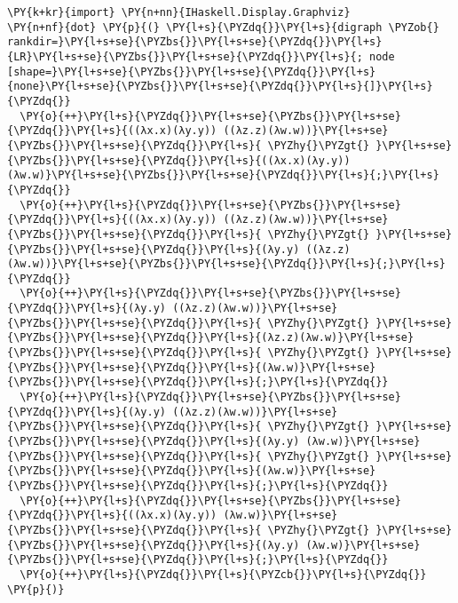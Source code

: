     \begin{tcolorbox}[breakable, size=fbox, boxrule=1pt, pad at break*=1mm,colback=cellbackground, colframe=cellborder, top=.75ex]
\begin{Verbatim}[commandchars=\\\{\}]
\PY{k+kr}{import} \PY{n+nn}{IHaskell.Display.Graphviz}
\PY{n+nf}{dot} \PY{p}{(} \PY{l+s}{\PYZdq{}}\PY{l+s}{digraph \PYZob{} rankdir=}\PY{l+s+se}{\PYZbs{}}\PY{l+s+se}{\PYZdq{}}\PY{l+s}{LR}\PY{l+s+se}{\PYZbs{}}\PY{l+s+se}{\PYZdq{}}\PY{l+s}{; node [shape=}\PY{l+s+se}{\PYZbs{}}\PY{l+s+se}{\PYZdq{}}\PY{l+s}{none}\PY{l+s+se}{\PYZbs{}}\PY{l+s+se}{\PYZdq{}}\PY{l+s}{]}\PY{l+s}{\PYZdq{}}
  \PY{o}{++}\PY{l+s}{\PYZdq{}}\PY{l+s+se}{\PYZbs{}}\PY{l+s+se}{\PYZdq{}}\PY{l+s}{((λx.x)(λy.y)) ((λz.z)(λw.w))}\PY{l+s+se}{\PYZbs{}}\PY{l+s+se}{\PYZdq{}}\PY{l+s}{ \PYZhy{}\PYZgt{} }\PY{l+s+se}{\PYZbs{}}\PY{l+s+se}{\PYZdq{}}\PY{l+s}{((λx.x)(λy.y)) (λw.w)}\PY{l+s+se}{\PYZbs{}}\PY{l+s+se}{\PYZdq{}}\PY{l+s}{;}\PY{l+s}{\PYZdq{}}
  \PY{o}{++}\PY{l+s}{\PYZdq{}}\PY{l+s+se}{\PYZbs{}}\PY{l+s+se}{\PYZdq{}}\PY{l+s}{((λx.x)(λy.y)) ((λz.z)(λw.w))}\PY{l+s+se}{\PYZbs{}}\PY{l+s+se}{\PYZdq{}}\PY{l+s}{ \PYZhy{}\PYZgt{} }\PY{l+s+se}{\PYZbs{}}\PY{l+s+se}{\PYZdq{}}\PY{l+s}{(λy.y) ((λz.z)(λw.w))}\PY{l+s+se}{\PYZbs{}}\PY{l+s+se}{\PYZdq{}}\PY{l+s}{;}\PY{l+s}{\PYZdq{}}
  \PY{o}{++}\PY{l+s}{\PYZdq{}}\PY{l+s+se}{\PYZbs{}}\PY{l+s+se}{\PYZdq{}}\PY{l+s}{(λy.y) ((λz.z)(λw.w))}\PY{l+s+se}{\PYZbs{}}\PY{l+s+se}{\PYZdq{}}\PY{l+s}{ \PYZhy{}\PYZgt{} }\PY{l+s+se}{\PYZbs{}}\PY{l+s+se}{\PYZdq{}}\PY{l+s}{(λz.z)(λw.w)}\PY{l+s+se}{\PYZbs{}}\PY{l+s+se}{\PYZdq{}}\PY{l+s}{ \PYZhy{}\PYZgt{} }\PY{l+s+se}{\PYZbs{}}\PY{l+s+se}{\PYZdq{}}\PY{l+s}{(λw.w)}\PY{l+s+se}{\PYZbs{}}\PY{l+s+se}{\PYZdq{}}\PY{l+s}{;}\PY{l+s}{\PYZdq{}}
  \PY{o}{++}\PY{l+s}{\PYZdq{}}\PY{l+s+se}{\PYZbs{}}\PY{l+s+se}{\PYZdq{}}\PY{l+s}{(λy.y) ((λz.z)(λw.w))}\PY{l+s+se}{\PYZbs{}}\PY{l+s+se}{\PYZdq{}}\PY{l+s}{ \PYZhy{}\PYZgt{} }\PY{l+s+se}{\PYZbs{}}\PY{l+s+se}{\PYZdq{}}\PY{l+s}{(λy.y) (λw.w)}\PY{l+s+se}{\PYZbs{}}\PY{l+s+se}{\PYZdq{}}\PY{l+s}{ \PYZhy{}\PYZgt{} }\PY{l+s+se}{\PYZbs{}}\PY{l+s+se}{\PYZdq{}}\PY{l+s}{(λw.w)}\PY{l+s+se}{\PYZbs{}}\PY{l+s+se}{\PYZdq{}}\PY{l+s}{;}\PY{l+s}{\PYZdq{}}
  \PY{o}{++}\PY{l+s}{\PYZdq{}}\PY{l+s+se}{\PYZbs{}}\PY{l+s+se}{\PYZdq{}}\PY{l+s}{((λx.x)(λy.y)) (λw.w)}\PY{l+s+se}{\PYZbs{}}\PY{l+s+se}{\PYZdq{}}\PY{l+s}{ \PYZhy{}\PYZgt{} }\PY{l+s+se}{\PYZbs{}}\PY{l+s+se}{\PYZdq{}}\PY{l+s}{(λy.y) (λw.w)}\PY{l+s+se}{\PYZbs{}}\PY{l+s+se}{\PYZdq{}}\PY{l+s}{;}\PY{l+s}{\PYZdq{}}
  \PY{o}{++}\PY{l+s}{\PYZdq{}}\PY{l+s}{\PYZcb{}}\PY{l+s}{\PYZdq{}} \PY{p}{)}
\end{Verbatim}
\end{tcolorbox}

